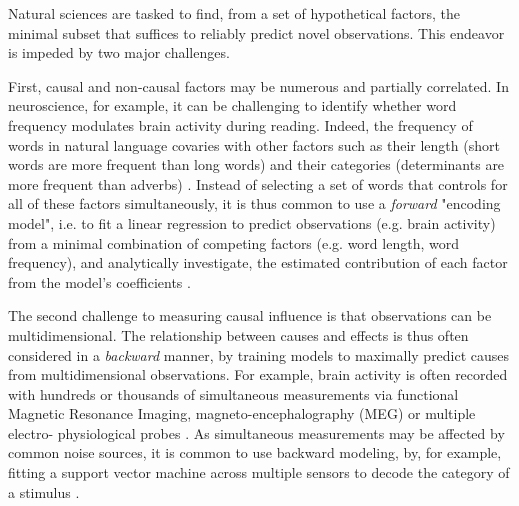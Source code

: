 Natural sciences are tasked to find, from a set of hypothetical factors, the
minimal subset that suffices to reliably predict novel observations. This
endeavor is impeded by two major challenges.

First, causal and non-causal factors may be numerous and partially correlated.
In neuroscience, for
example, it can be challenging to identify whether word frequency modulates
brain activity during reading. Indeed, the
frequency of words in natural language covaries with other factors such as their
length (short words are more frequent than long words) and their categories
(determinants are more frequent than adverbs)
\citep{kutas2011thirty,pegado2014timing}. Instead of selecting a set of words
that controls for all of these factors simultaneously, it is thus common to use
a \emph{forward} "encoding model", i.e. to fit a linear regression to predict observations
(e.g. brain activity) from a minimal combination of competing factors (e.g.
word length, word frequency), and analytically investigate,
the estimated contribution of each factor from the model's coefficients
\citep{friston1994statistical,naselaris2011encoding,weichwald2015causal,
king2018encoding,huth2016natural}.

The second challenge to measuring causal influence is that observations can be
multidimensional. The relationship between causes and effects is thus often
considered in a \emph{backward} manner, by training models to maximally predict causes
from multidimensional observations. For example, brain activity is often
recorded with hundreds or thousands of simultaneous measurements via functional
Magnetic Resonance Imaging, magneto-encephalography (MEG) or multiple electro-
physiological probes \citep{friston1994statistical,steinmetz2018challenges}.
As simultaneous measurements may be affected by common noise sources, it is
common to use backward
modeling, by, for example, fitting a support vector machine across multiple
sensors to decode the category of a stimulus \citep{norman2006beyond,cichy2014resolving,
kriegeskorte2008representational}.

